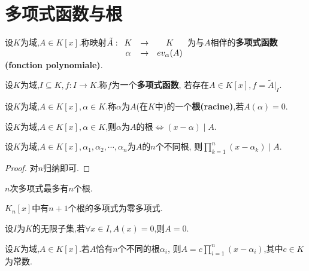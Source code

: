 \section{多项式函数与根}

\begin{deff}
    设$K$为域,$A \in K[x]$.称映射$\tilde{A}: \begin{array}[t]{ccc} K & \to & K 
    \\ \alpha & \to & ev_{\alpha}(A) \end{array}$为与$A$相伴的\textbf{多项式函数(fonction polynomiale)}.
\end{deff}

\begin{deff}
    设$K$为域,$I \subseteq K, f: I \to K$.称$f$为一个\textbf{多项式函数},
    若存在$A \in K[x], f = \tilde{A}|_I$.
\end{deff}

\begin{deff}
    设$K$为域,$A \in K[x], \alpha \in K$.称$\alpha$为$A$(在$K$中)的一个\textbf{根(racine)},若$A(\alpha) = 0$.
\end{deff}

\begin{prop}
    设$K$为域,$A \in K[x], \alpha \in K$,则$\alpha$为$A$的根$\iff (x - \alpha) \mid A$.
\end{prop}

\begin{prop}
    设$K$为域,$A \in K[x], \alpha_1, \alpha_2, \cdots, \alpha_n$为$A$的$n$个不同根,
    则$\prod\limits_{k=1}^n (x - \alpha_k) \mid A$.
\end{prop}

\begin{proof}
    对$n$归纳即可.
\end{proof}

\begin{cor}
    $n$次多项式最多有$n$个根.
\end{cor}

\begin{cor}
    $K_n[x]$中有$n+1$个根的多项式为零多项式.
\end{cor}

\begin{cor}
    设$I$为$K$的无限子集,若$\forall x \in I, A(x) = 0$,则$A = 0$.
\end{cor}

\begin{cor}
    设$K$为域,$A \in K[x]$.若$A$恰有$n$个不同的根$\alpha_i$,
    则$A = c \prod\limits_{i = 1}^n (x - \alpha_i)$,其中$c \in K$为常数.
\end{cor}

